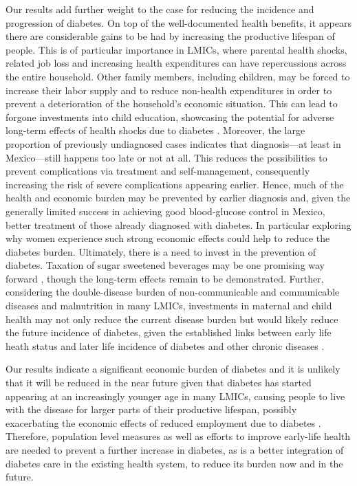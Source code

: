 \documentclass[12pt,english]{article}
\begin{document}
Our results add further weight to the case for reducing the incidence and progression of diabetes. On top of the well-documented health benefits, it appears there are considerable gains to be had by increasing the productive lifespan of people. This is of particular importance in \acl{LMICs}, where parental health shocks, related job loss and increasing health expenditures can have repercussions across the entire household. Other family members, including children, may be forced to increase their labor supply and to reduce non-health expenditures in order to prevent a deterioration of the household's economic situation. This can lead to forgone investments into child education, showcasing the potential for adverse long-term effects of health shocks due to diabetes \parencite{Bratti2014}. Moreover, the large proportion of previously undiagnosed cases indicates that diagnosis---at least in Mexico---still happens too late or not at all. This reduces the possibilities to prevent complications via treatment and self-management, consequently increasing the risk of severe complications appearing earlier. Hence, much of the health and economic burden may be prevented by earlier diagnosis and, given the generally limited success in achieving good blood-glucose control in Mexico, better treatment of those already diagnosed with diabetes. In particular exploring why women experience such strong economic effects could help to reduce the diabetes burden. Ultimately, there is a need to invest in the prevention of diabetes. Taxation of sugar sweetened beverages may be one promising way forward \parencite{Colchero2016}, though the long-term effects remain to be demonstrated. Further, considering the double-disease burden of non-communicable and communicable diseases and malnutrition in many \acl{LMICs}, investments in maternal and child health may not only reduce the current disease burden but would likely reduce the future incidence of diabetes, given the established links between early life heath status and later life incidence of diabetes and other chronic diseases \parencite{Sotomayor2013,Hanson2012,Li2010b}.  

Our results indicate a significant economic burden of diabetes and it is unlikely that it will be reduced in the near future given that diabetes has started appearing at an increasingly younger age in many \ac{LMICs}, causing people to live with the disease for larger parts of their productive lifespan, possibly exacerbating the economic effects of reduced employment due to diabetes \parencite{Hu2011,Villalpando2010}. Therefore, population level measures as well as efforts to improve early-life health are needed to prevent a further increase in diabetes, as is a better integration of diabetes care in the existing health system, to reduce its burden now and in the future.
\end{document}

